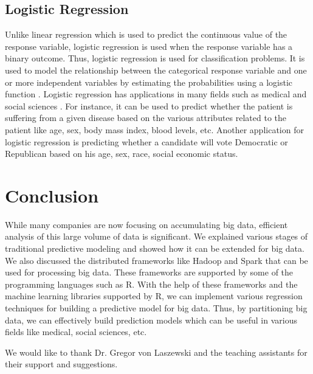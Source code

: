 \documentclass[sigconf]{acmart}
\begin{document}
\subsection{Logistic Regression}
Unlike linear regression which is used to predict the continuous value of the response variable, logistic regression is used when the response variable has a binary outcome. Thus, logistic regression is used for classification problems. It is used to model the relationship between the categorical response variable and one or more independent variables by estimating the probabilities using a logistic function \cite{log-reg}. Logistic regression has applications in many fields such as medical and social sciences \cite{log-reg}. For instance, it can be used to predict whether the patient is suffering from a given disease based on the various attributes related to the patient like age, sex, body mass index, blood levels, etc. Another application for logistic regression is predicting whether a candidate will vote Democratic or Republican based on his age, sex, race, social economic status.

\section{Conclusion}

While many companies are now focusing on accumulating big data, efficient analysis of this large volume of data is significant. We explained various stages of traditional predictive modeling and showed how it can be extended for big data. We also discussed the distributed frameworks like Hadoop and Spark that can be used for processing big data. These frameworks are supported by some of the programming languages such as R. With the help of these frameworks and the machine learning libraries supported by R, we can implement various regression techniques for building a predictive model for big data. Thus, by partitioning big data, we can effectively build prediction models which can be useful in various fields like medical, social sciences, etc.

\begin{acks}

  We would like to thank Dr. Gregor von Laszewski and the teaching assistants for their support and suggestions.

\end{acks}


 
\end{document}
